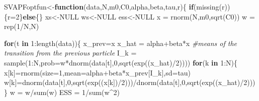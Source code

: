 \documentclass[
]{book}
\newenvironment{Shaded}{\begin{snugshade}}{\end{snugshade}}
\newcommand{\AttributeTok}[1]{\textcolor[rgb]{0.77,0.63,0.00}{#1}}
\newcommand{\CommentTok}[1]{\textcolor[rgb]{0.56,0.35,0.01}{\textit{#1}}}
\newcommand{\ConstantTok}[1]{\textcolor[rgb]{0.00,0.00,0.00}{#1}}
\newcommand{\ControlFlowTok}[1]{\textcolor[rgb]{0.13,0.29,0.53}{\textbf{#1}}}
\newcommand{\DecValTok}[1]{\textcolor[rgb]{0.00,0.00,0.81}{#1}}
\newcommand{\FunctionTok}[1]{\textcolor[rgb]{0.00,0.00,0.00}{#1}}
\newcommand{\NormalTok}[1]{#1}
\newcommand{\OtherTok}[1]{\textcolor[rgb]{0.56,0.35,0.01}{#1}}
\newcommand{\SpecialCharTok}[1]{\textcolor[rgb]{0.00,0.00,0.00}{#1}}
\theoremstyle{break}
\theoremstyle{nonumberplain}
\begin{document}
\begin{Shaded}
\begin{Highlighting}[]
\NormalTok{SVAPFoptfun}\OtherTok{\textless{}{-}}\ControlFlowTok{function}\NormalTok{(data,N,m0,C0,alpha,beta,tau,r)\{}
  \ControlFlowTok{if}\NormalTok{(}\FunctionTok{missing}\NormalTok{(r))\{r}\OtherTok{=}\DecValTok{2}\NormalTok{\}}\ControlFlowTok{else}\NormalTok{\{\}}
\NormalTok{  xs}\OtherTok{\textless{}{-}}\ConstantTok{NULL}
\NormalTok{  ws}\OtherTok{\textless{}{-}}\ConstantTok{NULL}
\NormalTok{  ess}\OtherTok{\textless{}{-}}\ConstantTok{NULL}
\NormalTok{  x  }\OtherTok{=} \FunctionTok{rnorm}\NormalTok{(N,m0,}\FunctionTok{sqrt}\NormalTok{(C0))}
\NormalTok{  w  }\OtherTok{=} \FunctionTok{rep}\NormalTok{(}\DecValTok{1}\SpecialCharTok{/}\NormalTok{N,N)}
  
  \ControlFlowTok{for}\NormalTok{(t }\ControlFlowTok{in} \DecValTok{1}\SpecialCharTok{:}\FunctionTok{length}\NormalTok{(data))\{}
\NormalTok{    x\_prev}\OtherTok{=}\NormalTok{x}
\NormalTok{    x\_hat }\OtherTok{=}\NormalTok{ alpha}\SpecialCharTok{+}\NormalTok{beta}\SpecialCharTok{*}\NormalTok{x }\CommentTok{\#means of the transition from the previous particle }
\NormalTok{    I\_k }\OtherTok{=} \FunctionTok{sample}\NormalTok{(}\DecValTok{1}\SpecialCharTok{:}\NormalTok{N,}\AttributeTok{prob=}\NormalTok{w}\SpecialCharTok{*}\FunctionTok{dnorm}\NormalTok{(data[t],}\DecValTok{0}\NormalTok{,}\FunctionTok{sqrt}\NormalTok{(}\FunctionTok{exp}\NormalTok{((x\_hat)}\SpecialCharTok{/}\DecValTok{2}\NormalTok{))))}
    \ControlFlowTok{for}\NormalTok{(k }\ControlFlowTok{in} \DecValTok{1}\SpecialCharTok{:}\NormalTok{N)\{}
\NormalTok{      x[k]}\OtherTok{=}\FunctionTok{rnorm}\NormalTok{(}\AttributeTok{size=}\DecValTok{1}\NormalTok{,}\AttributeTok{mean=}\NormalTok{alpha}\SpecialCharTok{+}\NormalTok{beta}\SpecialCharTok{*}\NormalTok{x\_prev[I\_k],}\AttributeTok{sd=}\NormalTok{tau)}
\NormalTok{      w[k]}\OtherTok{=}\FunctionTok{dnorm}\NormalTok{(data[t],}\DecValTok{0}\NormalTok{,}\FunctionTok{sqrt}\NormalTok{(}\FunctionTok{exp}\NormalTok{((x[k])}\SpecialCharTok{/}\DecValTok{2}\NormalTok{)))}\SpecialCharTok{/}\FunctionTok{dnorm}\NormalTok{(data[t],}\DecValTok{0}\NormalTok{,}\FunctionTok{sqrt}\NormalTok{(}\FunctionTok{exp}\NormalTok{((x\_hat)}\SpecialCharTok{/}\DecValTok{2}\NormalTok{)))}
\NormalTok{    \}}
\NormalTok{    w }\OtherTok{=}\NormalTok{ w}\SpecialCharTok{/}\FunctionTok{sum}\NormalTok{(w)}
\NormalTok{    ESS  }\OtherTok{=} \DecValTok{1}\SpecialCharTok{/}\FunctionTok{sum}\NormalTok{(w}\SpecialCharTok{\^{}}\DecValTok{2}\NormalTok{)}
    

\end{Highlighting}
\end{Shaded}
\end{document}
